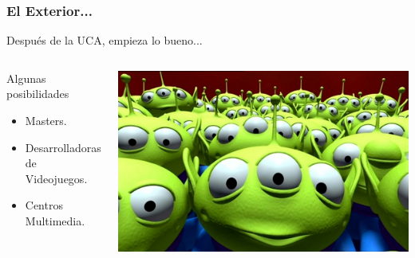 
\begin{frame}
	\frametitle{El Exterior...}
		
	Después de la UCA, empieza lo bueno...
	\newline
	\begin{columns}[c]
		\column{150pt}
			\begin{block}{Algunas posibilidades}
				\begin{itemize}
					\item Masters.
					\item Desarrolladoras de Videojuegos.
					\item Centros Multimedia.
				\end{itemize}
			\end{block}
		\column{150pt}
			\begin{center}
				\includegraphics[scale=0.15]{img/exterior.jpg}
			\end{center}
	\end{columns}
\end{frame}


